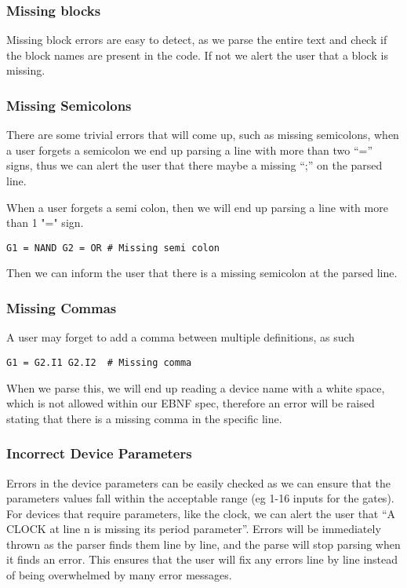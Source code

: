 \documentclass[10pt]{article}
\begin{document}
\subsubsection{Missing blocks}
\noi Missing block errors are easy to detect, as we parse the entire text and check if the block names are present in the code. If not we alert the user that a block is missing.



\subsubsection{Missing Semicolons}
\noi There are some trivial errors that will come up, such as missing semicolons, when a user forgets a semicolon we end up parsing a line with more than two “=” signs,  thus we can alert the user that there maybe a missing “;” on the parsed line.

\noi When a user forgets a semi colon, then we will end up parsing a line with more than 1 "=" sign. 

\begin{lstlisting}
G1 = NAND G2 = OR # Missing semi colon
\end{lstlisting}

\noi Then we can inform the user that there is a missing semicolon at the parsed line.

\subsubsection{Missing Commas}

A user may forget to add a comma between multiple definitions, as such

\begin{lstlisting}
G1 = G2.I1 G2.I2  # Missing comma
\end{lstlisting}

\noi When we parse this, we will end up reading a device name with a white space, which is not allowed within our EBNF spec, therefore an error will be raised stating that there is a missing comma in the specific line.

\subsubsection{Incorrect Device Parameters}

Errors in the device parameters can be easily checked as we can ensure that the parameters values fall within the acceptable range (eg 1-16 inputs for the gates). For devices that require parameters, like the clock, we can alert the user that “A CLOCK at line {n} is missing its period parameter”. 
Errors will be immediately thrown as the parser finds them line by line, and the parse will stop parsing when it finds an error. This ensures that the user will fix any errors line by line instead of being overwhelmed by many error messages.
\end{document}
